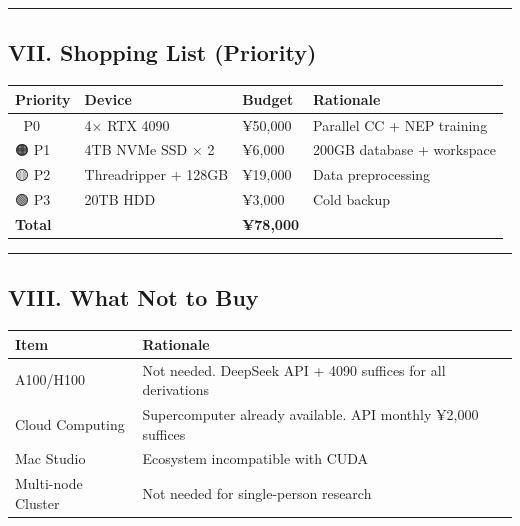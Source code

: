 \documentclass[
  12pt,
]{article}
\begin{document}
\begin{center}\rule{0.5\linewidth}{0.5pt}\end{center}

\subsection{VII. Shopping List (Priority)}\label{vii-shopping-list-priority}

\begin{longtable}[]{@{}llll@{}}
\toprule\noalign{}
Priority & Device & Budget & Rationale \\
\midrule\noalign{}
\endhead
\bottomrule\noalign{}
\endlastfoot
🔴 P0 & 4× RTX 4090 & ¥50,000 & Parallel CC + NEP training \\
🟠 P1 & 4TB NVMe SSD × 2 & ¥6,000 & 200GB database + workspace \\
🟡 P2 & Threadripper + 128GB & ¥19,000 & Data preprocessing \\
🟢 P3 & 20TB HDD & ¥3,000 & Cold backup \\
\textbf{Total} & & \textbf{¥78,000} & \\
\end{longtable}

\begin{center}\rule{0.5\linewidth}{0.5pt}\end{center}

\subsection{VIII. What Not to Buy}\label{viii-what-not-to-buy}

\begin{longtable}[]{@{}ll@{}}
\toprule\noalign{}
Item & Rationale \\
\midrule\noalign{}
\endhead
\bottomrule\noalign{}
\endlastfoot
A100/H100 & Not needed. DeepSeek API + 4090 suffices for all derivations \\
Cloud Computing & Supercomputer already available. API monthly ¥2,000 suffices \\
Mac Studio & Ecosystem incompatible with CUDA \\
Multi-node Cluster & Not needed for single-person research \\
\end{longtable}
\end{document}
